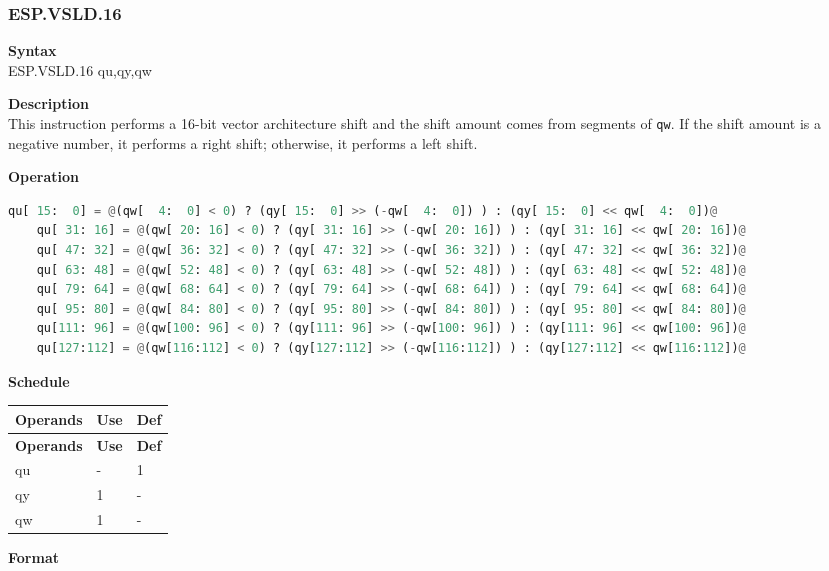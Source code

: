\newpage
\subsubsection{ESP.VSLD.16}\label{instruction:ESPVSLD16}
\textbf{Syntax}\\
ESP.VSLD.16 qu,qy,qw

\textbf{Description}\\
This instruction performs a 16-bit vector architecture shift and the shift amount comes from segments of \lstinline{qw}. If the shift amount is a negative number, it performs a right shift; otherwise, it performs a left shift.

\textbf{Operation}\\
\begin{lstlisting}[language=Python, escapechar=@]
    qu[ 15:  0] = @(qw[  4:  0] < 0) ? (qy[ 15:  0] >> (-qw[  4:  0]) ) : (qy[ 15:  0] << qw[  4:  0])@
    qu[ 31: 16] = @(qw[ 20: 16] < 0) ? (qy[ 31: 16] >> (-qw[ 20: 16]) ) : (qy[ 31: 16] << qw[ 20: 16])@
    qu[ 47: 32] = @(qw[ 36: 32] < 0) ? (qy[ 47: 32] >> (-qw[ 36: 32]) ) : (qy[ 47: 32] << qw[ 36: 32])@
    qu[ 63: 48] = @(qw[ 52: 48] < 0) ? (qy[ 63: 48] >> (-qw[ 52: 48]) ) : (qy[ 63: 48] << qw[ 52: 48])@
    qu[ 79: 64] = @(qw[ 68: 64] < 0) ? (qy[ 79: 64] >> (-qw[ 68: 64]) ) : (qy[ 79: 64] << qw[ 68: 64])@
    qu[ 95: 80] = @(qw[ 84: 80] < 0) ? (qy[ 95: 80] >> (-qw[ 84: 80]) ) : (qy[ 95: 80] << qw[ 84: 80])@
    qu[111: 96] = @(qw[100: 96] < 0) ? (qy[111: 96] >> (-qw[100: 96]) ) : (qy[111: 96] << qw[100: 96])@
    qu[127:112] = @(qw[116:112] < 0) ? (qy[127:112] >> (-qw[116:112]) ) : (qy[127:112] << qw[116:112])@

\end{lstlisting}

\textbf{Schedule}\\
\begin{longtable}[c]{|l|l|l|}
    \hline
    \rowcolor{lightgray}
    \textbf{Operands} & \textbf{Use} & \textbf{Def} \\\hline
    \endfirsthead
    \hline
    \rowcolor{lightgray}
     \textbf{Operands} & \textbf{Use} & \textbf{Def} \\\hline
    \endhead
    \hline
    \endfoot

  qu & - & 1 \\\hline
  qy & 1 & - \\\hline
  qw & 1 & -

\end{longtable}

\textbf{Format}\\

